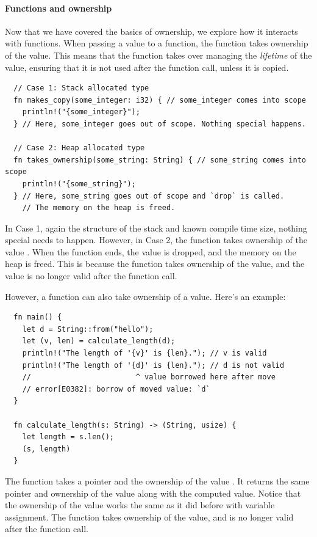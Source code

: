 \documentclass[11pt]{report}
\theoremstyle{definition}
\theoremstyle{plain}
\begin{document}
\paragraph{Functions and ownership}\label{sec:rustlifetimes} %
Now that we have covered the basics of ownership, we explore how it interacts with functions. When passing a value to a function, the function takes ownership of the value. This means that the function takes over managing the \textit{lifetime} of the value, ensuring that it is not used after the function call, unless it is copied.
\begin{verbatim}
  // Case 1: Stack allocated type
  fn makes_copy(some_integer: i32) { // some_integer comes into scope
    println!("{some_integer}");
  } // Here, some_integer goes out of scope. Nothing special happens.

  // Case 2: Heap allocated type
  fn takes_ownership(some_string: String) { // some_string comes into scope
    println!("{some_string}");
  } // Here, some_string goes out of scope and `drop` is called.
    // The memory on the heap is freed.
\end{verbatim}

In Case 1, again the structure of the stack and known compile time size, nothing special needs to happen. However, in Case 2, the function  takes ownership of the  value . When the function ends, the  value is dropped, and the memory on the heap is freed. This is because the function takes ownership of the value, and the value is no longer valid after the function call.

However, a function can also take ownership of a value. Here's an example:
\begin{verbatim}
  fn main() {
    let d = String::from("hello");
    let (v, len) = calculate_length(d);
    println!("The length of '{v}' is {len}."); // v is valid
    println!("The length of '{d}' is {len}."); // d is not valid
    //                        ^ value borrowed here after move
    // error[E0382]: borrow of moved value: `d`
  }

  fn calculate_length(s: String) -> (String, usize) {
    let length = s.len();
    (s, length)
  }
\end{verbatim}
The function  takes a pointer and the ownership of the  value . It returns the same pointer and ownership of the value along with the computed value. Notice that the ownership of the value works the same as it did before with variable assignment. The function  takes ownership of the value, and  is no longer valid after the function call.
\end{document}
